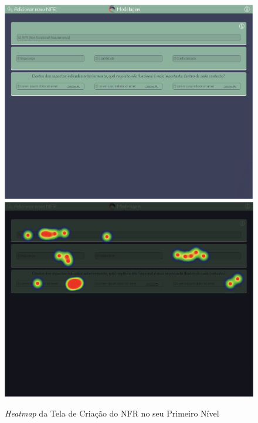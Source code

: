 \begin{figure}[]
  \begin{center}
      \caption{{\textit{Heatmap} da Tela de Criação do NFR no seu Primeiro Nível}}
      \label{fig:nfr_hm_2}
      \includegraphics[scale=0.43]{figuras/UsabilityHub/nfr/3.png}
      \includegraphics[scale=0.43]{figuras/UsabilityHub/nfr/4.png}
  \end{center}
\end{figure}

